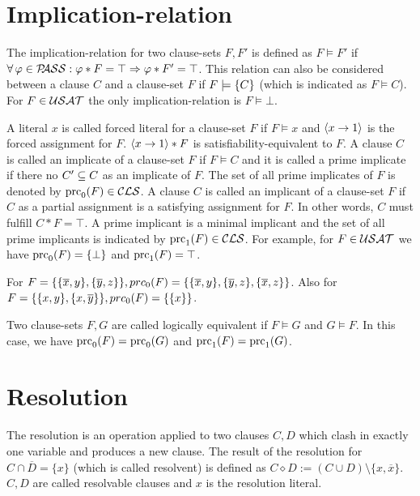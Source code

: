\documentclass[]{book}
\begin{document}
\section{Implication-relation}
\label{sec:imprel}

The implication-relation for two clause-sets $F, F'$ is defined as $F \models F'$ if $\forall\, \varphi \in \mathcal{P\hspace{-0.32em}ASS} : \varphi * F = \top \Rightarrow \varphi * F' = \top$. This relation can also be considered between a clause $C$ and a clause-set $F$ if $F \models \{ C \}$ (which is indicated as $F \models C$). For  $F \in \mathcal{USAT}$ the only implication-relation is $F \models \bot$. 

A literal $x$ is called forced literal for a clause-set $F$ if $F \models x$ and $\langle x \rightarrow 1 \rangle$ is the forced assignment for $F$. $\langle x \rightarrow 1 \rangle * F$ is satisfiability-equivalent to $F$. A clause $C$ is called an implicate of a clause-set $F$ if $F \models C$ and it is called a prime implicate if there no $ C' \subseteq C$ as an implicate of $F$. The set of all prime implicates of $F$ is denoted by $\operatorname{prc}_0(F) \in \mathcal{CLS}$. A clause $C$ is called an implicant of a clause-set $F$ if $C$ as a partial assignment is a satisfying assignment for $F$. In other words, $C$ must fulfill $C * F=\top$. A prime implicant is a minimal implicant and the set of all prime implicants is indicated by $\operatorname{prc}_1(F) \in \mathcal{CLS}$. For example, for $F \in \mathcal{USAT}$ we have $\operatorname{prc}_0(F) = \{ \bot \}$ and $\operatorname{prc}_1(F) = \top$.

\begin{examp}\label{exp:bbb}
For $F = \{\{ \overline x, y\} , \{ \overline y, z\}\}, prc_0(F) = \{\{\overline x, y\} , \{\overline y, z\} , \{\overline x, z\}\}$. Also for $F = \{ \{ x, y \} , \{ x,\overline y \} \}, prc_0(F) = \{ \{ x \} \}$.
\end{examp}

Two clause-sets $F, G$ are called logically equivalent if $F \models G$ and $G \models F$. In this case, we have $\operatorname{prc}_0(F) = \operatorname{prc}_0(G)$ and $\operatorname{prc}_1(F) = \operatorname{prc}_1(G)$.

\section{Resolution}
\label{sec:Resolution}

The resolution is an operation applied to two clauses $C,D$ which clash in exactly one variable and produces a new clause. The result of the resolution for $C \cap \overline D = \{ x \}$ (which is called resolvent) is defined as $C \diamond D := (C \cup D) \setminus \{x, \overline x\} $. $C,D$ are called resolvable clauses and $x$ is the resolution literal.
\end{document}
